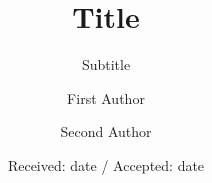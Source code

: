 \documentclass[twocolumn,epjc3]{svjour3}
\title{Title\thanksref{title}}
\subtitle{Subtitle}
\institute{
  First address \label{address1} \and
  Second address \label{address2} \and
  \emph{Present Address:} if needed\label{address3}
}
\date{Received: date / Accepted: date}
\begin{document}
\author{
  First Author \and
  Second Author
}

\maketitle

\begin{abstract}
\blindtext
\end{abstract}

\Blinddocument
\end{document}
